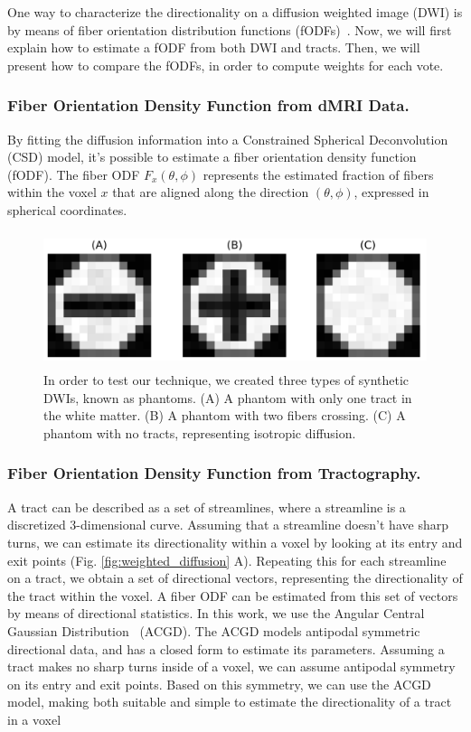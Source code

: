 One way to characterize the directionality on a diffusion weighted image (DWI) is
by means of fiber orientation distribution functions (fODFs)~\cite{Tuch2004}. Now, we will first
explain how to estimate a fODF from both DWI and tracts. Then, we will present
how to compare the fODFs, in order to compute weights for each vote.

\subsubsection{Fiber Orientation Density Function from dMRI Data.}
By fitting the diffusion information into a Constrained Spherical Deconvolution (CSD)
model, it's possible to estimate a fiber orientation density function\cite{Tournier2004} (fODF). 
The fiber ODF $F_x(\theta, \phi)$ represents the estimated fraction of fibers
within the voxel $x$ that are aligned along the direction $(\theta, \phi)$,
expressed in spherical coordinates.

\begin{figure}[t!]
    \includegraphics[height=150px]{7.multiatlas/img/phantoms.png}
    \caption{In order to test our technique, we created three types of synthetic DWIs, known as phantoms.
             (A) A phantom with only one tract in the white matter. (B) A phantom with two fibers crossing.
             (C) A phantom with no tracts, representing isotropic diffusion.}
    \label{fig:pha_exp_1}
\end{figure}

\subsubsection{Fiber Orientation Density Function from Tractography.}
A tract can be described as a set of streamlines, where a streamline is a
discretized 3-dimensional curve. Assuming that a streamline doesn't have sharp
turns, we can estimate its directionality within a voxel by looking at its
entry and exit points (Fig. \ref{fig:weighted_diffusion} A). Repeating this for each streamline
on a tract, we obtain a set of directional vectors, representing the directionality
of the tract within the voxel. A fiber ODF can be estimated from this set of
vectors by means of directional statistics. In this work, we use the
Angular Central Gaussian Distribution~\cite{Mardia1999} (ACGD). The ACGD models 
antipodal symmetric directional data, and has a closed form to estimate its
parameters. Assuming a tract makes no sharp turns inside of a voxel, we can
assume antipodal symmetry on its entry and exit points. Based on this symmetry,
we can use the ACGD model, making both suitable and simple to estimate the
directionality of a tract in a voxel~\cite{Mardia1999}
   

